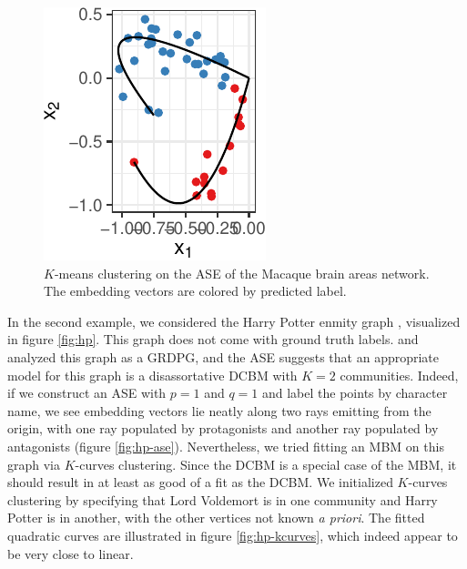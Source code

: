 \documentclass[
  11pt,
]{article}
\theoremstyle{definition}
\theoremstyle{definition}
\theoremstyle{definition}
\theoremstyle{definition}
\theoremstyle{remark}
\begin{document}
\begin{figure}[H]

{\centering \includegraphics{draft_files/figure-latex/macaque-fitted-1} 

}

\caption{$K$-means clustering on the ASE of the Macaque brain areas network. The embedding vectors are colored by predicted label.}\label{fig:macaque-fitted}
\end{figure}

In the second example, we considered the Harry Potter enmity graph \citep{harrypotter}, visualized in figure \ref{fig:hp}.
This graph does not come with ground truth labels.
\citet{rubindelanchy2017statistical} and \citet{SannaPassino2022} analyzed this graph as a GRDPG, and the ASE suggests that an appropriate model for this graph is a disassortative DCBM with \(K = 2\) communities.
Indeed, if we construct an ASE with \(p = 1\) and \(q = 1\) and label the points by character name, we see embedding vectors lie neatly along two rays emitting from the origin, with one ray populated by protagonists and another ray populated by antagonists (figure \ref{fig:hp-ase}).
Nevertheless, we tried fitting an MBM on this graph via \(K\)-curves clustering.
Since the DCBM is a special case of the MBM, it should result in at least as good of a fit as the DCBM.
We initialized \(K\)-curves clustering by specifying that Lord Voldemort is in one community and Harry Potter is in another, with the other vertices not known \emph{a priori}.
The fitted quadratic curves are illustrated in figure \ref{fig:hp-kcurves}, which indeed appear to be very close to linear.
\end{document}
